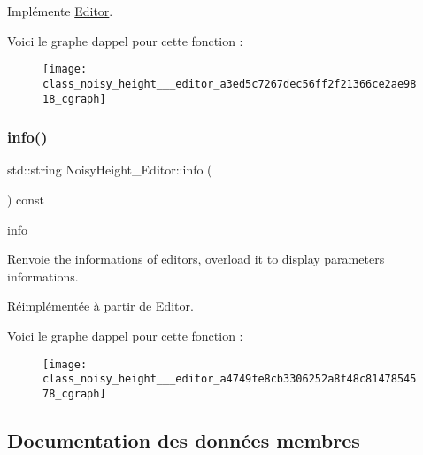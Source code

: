Implémente \hyperlink{class_editor_abca97ba11536c494a0c26bac77917792}{Editor}.

Voici le graphe d\textquotesingle{}appel pour cette fonction \+:
\nopagebreak
\begin{figure}[H]
\begin{center}
\leavevmode
\texttt{[image: class\_noisy\_height\_\_\_editor\_a3ed5c7267dec56ff2f21366ce2ae9818\_cgraph]}
\end{center}
\end{figure}
\mbox{\label{class_noisy_height___editor_a4749fe8cb3306252a8f48c8147854578}} 
\subsubsection{\texorpdfstring{info()}{info()}}
{\footnotesize\ttfamily std\+::string Noisy\+Height\+\_\+\+Editor\+::info (\begin{DoxyParamCaption}{ }\end{DoxyParamCaption}) const\hspace{0.3cm}{\ttfamily [virtual]}}



info 

\begin{DoxyReturn}{Renvoie}
the informations of editors, overload it to display parameters informations. 
\end{DoxyReturn}


Réimplémentée à partir de \hyperlink{class_editor_a5747cd74b71d67f6d39b094071058382}{Editor}.

Voici le graphe d\textquotesingle{}appel pour cette fonction \+:\nopagebreak
\begin{figure}[H]
\begin{center}
\leavevmode
\texttt{[image: class\_noisy\_height\_\_\_editor\_a4749fe8cb3306252a8f48c8147854578\_cgraph]}
\end{center}
\end{figure}


\subsection{Documentation des données membres}
\mbox{\label{class_noisy_height___editor_ac6b90169942b0bb92d6461dbf9a2e000}} 
